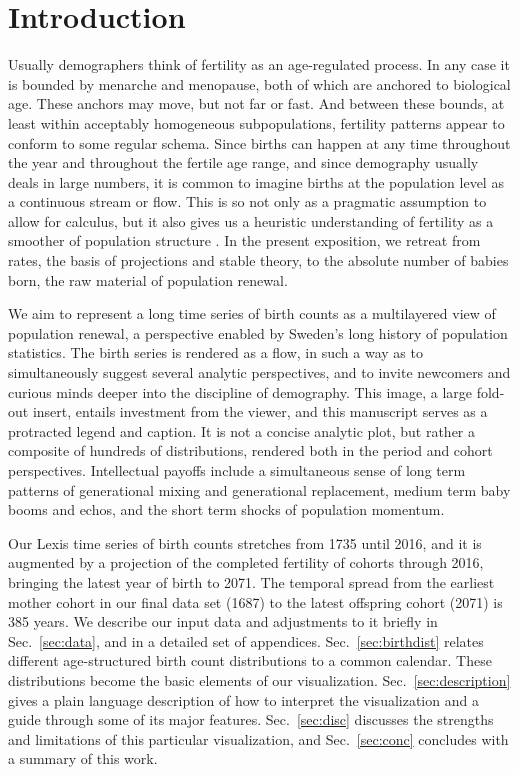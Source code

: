 \documentclass{article}
\begin{document}
\pagebreak
\section{Introduction}
Usually demographers think of fertility as an age-regulated process. In any case it is bounded by menarche and menopause, both of which are anchored to biological age. These anchors may move, but not far or fast. And between these bounds, at least within acceptably homogeneous subpopulations, fertility patterns appear to conform to some regular schema. Since births can happen at any time throughout the year and throughout the fertile age range, and since demography usually deals in large numbers, it is common to imagine births at the population level as a continuous stream or flow. This is so not only as a pragmatic assumption to allow for calculus, but it also gives us a heuristic understanding of fertility as a smoother of population structure \citep{arthur1982ergodic}. In the present exposition, we retreat from rates, the basis of projections and stable theory, to the absolute number of babies born, the raw material of population renewal. 

We aim to represent a long time series of birth counts as a multilayered view of population renewal, a perspective enabled by Sweden's long history of population statistics. The birth series is rendered as a flow, in such a way as to simultaneously suggest several analytic perspectives, and to invite newcomers and curious minds deeper into the discipline of demography. This image, a large fold-out insert, entails investment from the viewer, and this manuscript serves as a protracted legend and caption. It is not a concise analytic plot, but rather a composite of hundreds of distributions, rendered both in the period and cohort perspectives. Intellectual payoffs include a simultaneous sense of long term patterns of generational mixing and generational replacement, medium term baby booms and echos, and the short term shocks of population momentum. %

Our Lexis time series of birth counts stretches from 1735 until 2016, and it is augmented by a projection of the completed fertility of cohorts through 2016, bringing the latest year of birth to 2071. The temporal spread from the earliest mother cohort in our final data set (1687) to the latest offspring cohort (2071) is 385 years. We describe our input data and adjustments to it briefly in Sec.~\ref{sec:data}, and in a detailed set of appendices. Sec.~\ref{sec:birthdist} relates different age-structured birth count distributions to a common calendar. These distributions become the basic elements of our visualization. Sec.~\ref{sec:description} gives a plain language description of how to interpret the visualization and a guide through some of its major features. Sec.~\ref{sec:disc} discusses the strengths and limitations of this particular visualization, and Sec.~\ref{sec:conc} concludes with a summary of this work.
\end{document}
